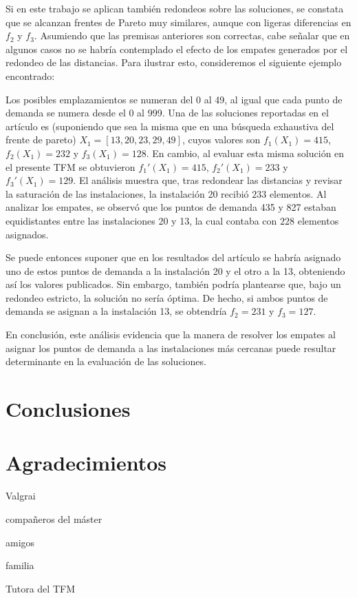 \documentclass[12pt,a4paper]{book}
\begin{document}
Si en este trabajo se aplican también redondeos sobre las soluciones, se constata que se alcanzan frentes de Pareto muy similares, aunque con ligeras diferencias en $f_2$ y $f_3$. Asumiendo que las premisas anteriores son correctas, cabe señalar que en algunos casos no se habría contemplado el efecto de los empates generados por el redondeo de las distancias. Para ilustrar esto, consideremos el siguiente ejemplo encontrado:

Los posibles emplazamientos se numeran del 0 al 49, al igual que cada punto de demanda se numera desde el 0 al 999. Una de las soluciones reportadas en el artículo es (suponiendo que sea la misma que en una búsqueda exhaustiva del frente de pareto) $X_1 = [13, 20, 23, 29, 49]$, cuyos valores son $f_1(X_1) = 415$, $f_2(X_1) = 232$ y $f_3(X_1) = 128$. En cambio, al evaluar esta misma solución en el presente TFM se obtuvieron $f_1'(X_1) = 415$, $f_2'(X_1) = 233$ y $f_3'(X_1) = 129$.
El análisis muestra que, tras redondear las distancias y revisar la saturación de las instalaciones, la instalación 20 recibió $233$ elementos. Al analizar los empates, se observó que los puntos de demanda 435 y 827 estaban equidistantes entre las instalaciones 20 y 13, la cual contaba con $228$ elementos asignados.

Se puede entonces suponer que en los resultados del artículo se habría asignado uno de estos puntos de demanda a la instalación 20 y el otro a la 13, obteniendo así los valores publicados. Sin embargo, también podría plantearse que, bajo un redondeo estricto, la solución no sería óptima.
De hecho, si ambos puntos de demanda se asignan a la instalación 13, se obtendría $f_2 = 231$ y $f_3 = 127$.

En conclusión, este análisis evidencia que la manera de resolver los empates al asignar los puntos de demanda a las instalaciones más cercanas puede resultar determinante en la evaluación de las soluciones.
\chapter{Conclusiones}


\chapter{Agradecimientos}
Valgrai

compañeros del máster

amigos

familia

Tutora del TFM
\end{document}
